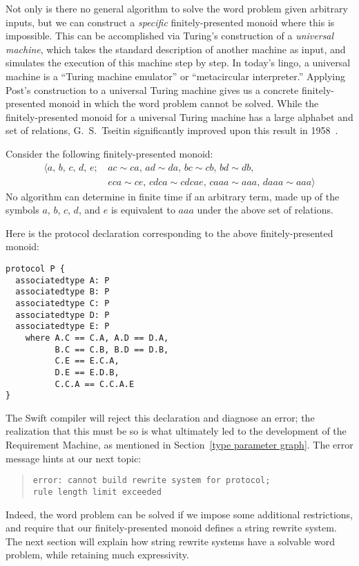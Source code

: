 \documentclass[../generics]{subfiles}
\begin{document}
Not only is there no general algorithm to solve the word problem given arbitrary inputs, but we can construct a \emph{specific} finitely-presented monoid where this is impossible. This can be accomplished via Turing's construction of a \emph{universal machine}, which takes the standard description of another machine as input, and simulates the execution of this machine step by step. In today's lingo, a universal machine is a ``Turing machine emulator'' or ``metacircular interpreter.'' Applying Post's construction to a universal Turing machine gives us a concrete finitely-presented monoid in which the word problem cannot be solved. While the finitely-presented monoid for a universal Turing machine has a large alphabet and set of relations, G.~S.~Tseitin significantly improved upon this result in 1958~\cite{undecidablesemigroup}.
\begin{theorem}\label{undecidablemonoid} Consider the following finitely-presented monoid:
\begin{align*}
\langle a,\,b,\,c,\,d,\,e;\,&ac\sim ca,\,ad\sim da,\,bc\sim cb,\,bd\sim db,\\
&eca\sim ce,\,cdca\sim cdcae,\,caaa\sim aaa,\,daaa\sim aaa\rangle
\end{align*}
No algorithm can determine in finite time if an arbitrary term, made up of the symbols $a$, $b$, $c$, $d$, and $e$ is equivalent to $aaa$ under the above set of relations.
\end{theorem}

Here is the protocol declaration corresponding to the above finitely-presented monoid:
\begin{Verbatim}
protocol P {
  associatedtype A: P
  associatedtype B: P
  associatedtype C: P
  associatedtype D: P
  associatedtype E: P
    where A.C == C.A, A.D == D.A,
          B.C == C.B, B.D == D.B,
          C.E == E.C.A,
          D.E == E.D.B,
          C.C.A == C.C.A.E
}
\end{Verbatim}
The Swift compiler will reject this declaration and diagnose an error; the realization that this must be so is what ultimately led to the development of the Requirement Machine, as mentioned in Section~\ref{type parameter graph}. The error message hints at our next topic:
\begin{quote}
\begin{verbatim}
error: cannot build rewrite system for protocol;
rule length limit exceeded
\end{verbatim}
\end{quote}
Indeed, the word problem can be solved if we impose some additional restrictions, and require that our finitely-presented monoid defines a string rewrite system. The next section will explain how string rewrite systems have a solvable word problem, while retaining much expressivity.
\end{document}
